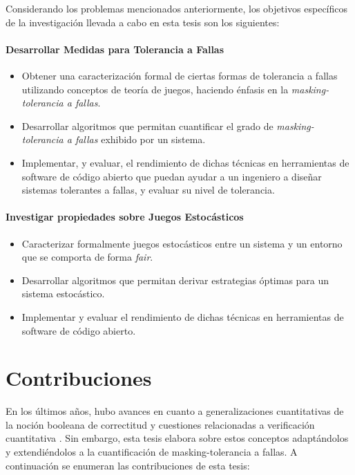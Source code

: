 Considerando los problemas mencionados anteriormente, los objetivos específicos de la investigación llevada a cabo en esta tesis son los siguientes:

\paragraph{Desarrollar Medidas para Tolerancia a Fallas}
\begin{itemize}
\item Obtener una caracterización formal de ciertas formas de tolerancia a fallas utilizando conceptos de teoría de juegos, haciendo énfasis en la \textit{masking-tolerancia a fallas}. 
    
\item Desarrollar algoritmos que permitan cuantificar el grado de \textit{masking-tolerancia a fallas} exhibido por un sistema.

\item Implementar, y evaluar, el rendimiento de dichas técnicas en herramientas de software de código abierto que puedan ayudar a un ingeniero a diseñar sistemas tolerantes a fallas, y evaluar su nivel de tolerancia.
\end{itemize}

\paragraph{Investigar propiedades sobre Juegos Estocásticos}
\begin{itemize}
\item Caracterizar formalmente juegos estocásticos entre un sistema y un entorno que se comporta de forma \textit{fair}. 
    
\item Desarrollar algoritmos que permitan derivar estrategias óptimas para un sistema estocástico.

\item Implementar y evaluar el rendimiento de dichas técnicas en herramientas de software de código abierto.
\end{itemize}


\section{Contribuciones}
\label{sec:intro.contribuciones}

En los últimos años, hubo avances en cuanto a generalizaciones cuantitativas de la noción booleana de correctitud y cuestiones relacionadas a verificación cuantitativa \cite{BokerCHK14,CernyHR12,Henzinger10,Henzinger13}.
Sin embargo, esta tesis elabora sobre estos conceptos adaptándolos y extendiéndolos a la cuantificación de masking-tolerancia a fallas.
A continuación se enumeran las contribuciones de esta tesis:

